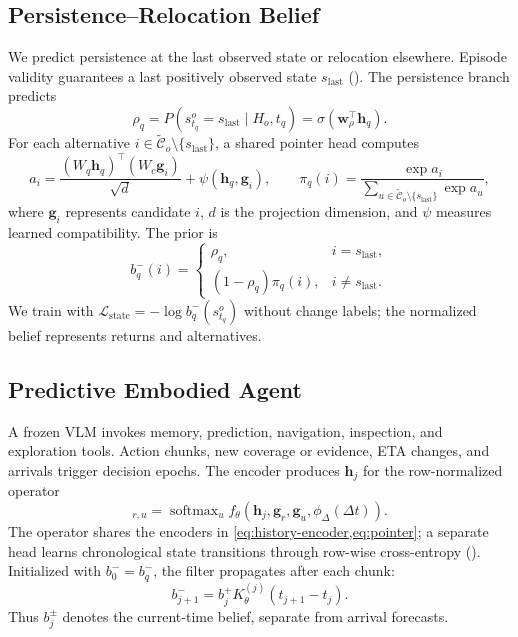 \subsection{Persistence--Relocation Belief}
\label{sec:belief_model}
We predict persistence at the last observed state or relocation elsewhere.
Episode validity guarantees a last positively observed state $s_{\mathrm{last}}$
(). The persistence branch predicts
\begin{equation}
\rho_q=P(s_{t_q}^o=s_{\mathrm{last}}\mid H_o,t_q)
=\sigma(\mathbf w_{\rho}^{\top}\mathbf h_q).
\label{eq:persistence}
\end{equation}
For each alternative $i\in\widetilde{\mathcal C}_o\setminus
\{s_{\mathrm{last}}\}$, a shared pointer head computes
\begin{equation}
a_i=\frac{(W_q\mathbf h_q)^\top(W_c\mathbf g_i)}{\sqrt d}
+\psi(\mathbf h_q,\mathbf g_i),\qquad
\pi_q(i)=\frac{\exp a_i}{\sum_{u\in\widetilde{\mathcal C}_o\setminus\{s_{\mathrm{last}}\}}\exp a_u},
\label{eq:pointer}
\end{equation}
where $\mathbf g_i$ represents candidate $i$, $d$ is the projection dimension,
and $\psi$ measures learned compatibility. The prior is
\begin{equation}
b_q^-(i)=
\begin{cases}
\rho_q, & i=s_{\mathrm{last}},\\
(1-\rho_q)\pi_q(i), & i\neq s_{\mathrm{last}}.
\end{cases}
\label{eq:prior}
\end{equation}
We train with $\mathcal L_{\mathrm{state}}=-\log b_q^-(s_{t_q}^o)$ without
change labels; the normalized belief represents returns and alternatives.

\subsection{Predictive Embodied Agent}
\label{sec:agent}

A frozen VLM invokes memory, prediction, navigation, inspection, and exploration
tools. Action chunks, new coverage or evidence, ETA changes, and arrivals trigger
decision epochs. The encoder produces $\mathbf h_j$ for the row-normalized operator
\begin{equation}
[K_\theta^{(j)}(\Delta t)]_{r,u}=\operatorname{softmax}_{u}
f_\theta(\mathbf h_j,\mathbf g_r,\mathbf g_u,\phi_\Delta(\Delta t)).
\label{eq:transition-kernel}
\end{equation}
The operator shares the encoders in \cref{eq:history-encoder,eq:pointer}; a separate head
learns chronological state transitions through row-wise cross-entropy
(). Initialized with $b_0^-=b_q^-$, the filter propagates after each chunk:
\begin{equation}
b_{j+1}^-=b_j^+K_\theta^{(j)}(t_{j+1}-t_j).
\label{eq:filter-predict}
\end{equation}
Thus $b_j^\pm$ denotes the current-time belief, separate from arrival forecasts.


